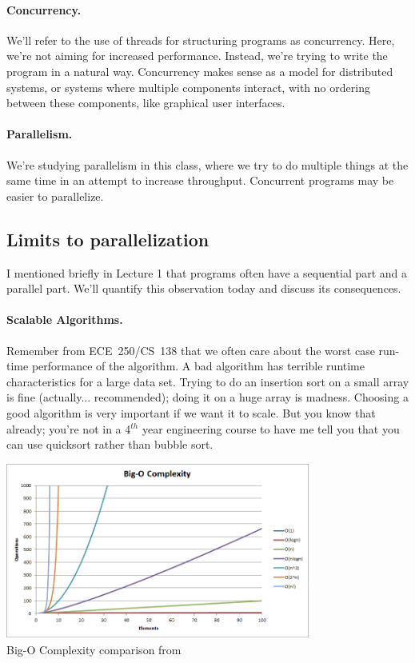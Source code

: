 \documentclass[a4paper]{report}
\begin{document}
\paragraph{Concurrency.} We'll refer to the use of threads for
structuring programs as concurrency. Here, we're not aiming
for increased performance. Instead, we're trying to write the program
in a natural way. Concurrency makes sense as a model for distributed
systems, or systems where multiple components interact, with no ordering
between these components, like graphical user interfaces.

\paragraph{Parallelism.} We're studying parallelism in this class, where
we try to do multiple things at the same time in an attempt to increase
throughput. Concurrent programs may be easier to parallelize.

\subsection*{Limits to parallelization}
I mentioned briefly in Lecture 1 that programs often have a sequential
part and a parallel part. We'll quantify this observation today
and discuss its consequences.

\paragraph{Scalable Algorithms.} 
Remember from ECE~250/CS~138 that we often care about the worst case run-time performance of the algorithm. A bad algorithm has terrible runtime characteristics for a large data set. Trying to do an insertion sort on a small array is fine (actually... recommended); doing it on a huge array is madness. Choosing a good algorithm is very important if we want it to scale.  But you know that already; you're not in a 4$^{th}$ year engineering course to have me tell you that you can use quicksort rather than bubble sort.

\begin{center}
	\includegraphics[width=0.75\textwidth]{images/big-o-complexity}\\
	Big-O Complexity comparison from ~\cite{bigocheatsheet}
\end{center}
\end{document}

